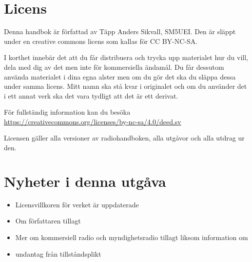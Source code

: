 \section*{Licens}

Denna handbok är författad av Täpp Anders Sikvall, SM5UEI. Den är
släppt under en creative commons licens som kallas för CC BY-NC-SA.

I korthet innebär det att du får distribuera och trycka upp materialet
hur du vill, dela med dig av det men inte för kommersiella ändamål. Du
får dessutom använda materialet i dina egna alster men om du gör det
ska du släppa dessa under samma licens. Mitt namn ska stå kvar i
originalet och om du använder det i ett annat verk ska det vara
tydligt att det är ett derivat.

För fullständig information kan du besöka \\
\url{https://creativecommons.org/licenses/by-nc-sa/4.0/deed.sv}

Licensen gäller alla versioner av radiohandboken, alla utgåvor och
alla utdrag ur den.

\clearpage

\section*{Nyheter i denna utgåva}

\begin{itemize}
  \item Licensvillkoren för verket är uppdaterade
  \item Om författaren tillagt
  \item Mer om kommersiell radio och myndighetsradio tillagt liksom information om
  \item undantag från tillståndsplikt
\end{itemize}

\clearpage


